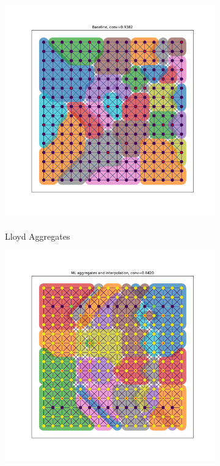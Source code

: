 \documentclass{article}
\begin{document}
\begin{figure}[b]
  \centering
  \begin{subfigure}[b]{\textwidth}
    \centering
    \includegraphics[height=4in]{anisotropic_lloyd.pdf}
    \caption{Lloyd Aggregates}
  \end{subfigure}
  \hfill
  \begin{subfigure}[b]{0.49\textwidth}
    \centering
    \includegraphics[width=\textwidth]{anisotropic_full.pdf}

\end{subfigure}
\end{figure}
\end{document}
